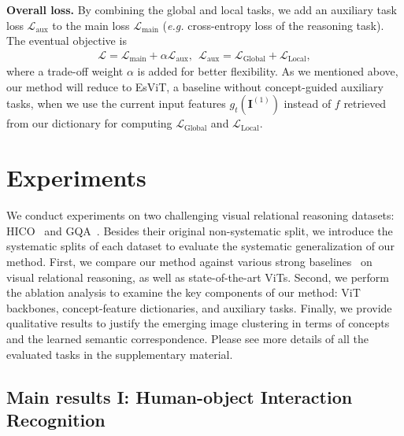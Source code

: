 \documentclass{article} \usepackage{iclr2022_conference,times}
\renewcommand{\paragraph}[1]{\noindent\textbf{#1.}}
\newcommand{\image}{\mathbf{I}}
\newcommand{\loss}{\mathcal{L}}
\begin{document}
\paragraph{Overall loss}
By combining the global and local tasks, we add an auxiliary task loss $\loss_{\operatorname{aux}}$ to the main loss $\loss_{\operatorname{main}}$ (\emph{e.g.} cross-entropy loss of the reasoning task). The eventual objective is
\vskip -0.25in
\begin{align}\label{loss:main}
    \loss = \loss_{\operatorname{main}} + \alpha\loss_{\operatorname{aux}},~~\loss_{\operatorname{aux}} = \loss_{\operatorname{Global}} + \loss_{\operatorname{Local}},
\end{align}
\vskip -0.1in
where a trade-off weight $\alpha$ is added for better flexibility. As we mentioned above, our method will reduce to EsViT, a baseline without concept-guided auxiliary tasks, when we use the current input features $g_t(\image^{(1)})$ instead of $f$ retrieved from our dictionary for computing $\loss_{\operatorname{Global}}$ and $\loss_{\operatorname{Local}}$. 


\vspace{-0.1in}
\section{Experiments}
\label{sec:exp}
\vspace{-0.1in}




We conduct experiments on two challenging visual relational reasoning datasets: HICO~\citep{hico} and GQA~\citep{gqa}. Besides their original non-systematic split, we introduce the systematic splits of each dataset to evaluate the systematic generalization of our method. 
First, we compare our method against various strong baselines~\citep{mallya2016learning,girdhar2017attentional,hudson2018compositional} on visual relational reasoning, as well as state-of-the-art ViTs. 
Second, we perform the ablation analysis to examine the key components of our method: ViT backbones, concept-feature dictionaries, and auxiliary tasks.
Finally, we provide qualitative results to justify the emerging image clustering in terms of concepts and the learned semantic correspondence.
Please see more details of all the evaluated tasks in the supplementary material.


\vspace{-0.1in}
\subsection{Main results I: Human-object Interaction Recognition}
\label{sec:exp_hoi}
\vspace{-0.05in}
\end{document}
